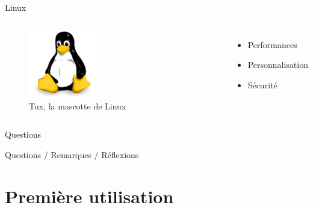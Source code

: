 \documentclass[aspectratio=169,xcolor=dvipsnames]{beamer}
\begin{document}
\begin{frame}{Linux}
    \begin{columns}[c] %

        \begin{figure}
            \includegraphics[width=0.4\textwidth]{images/tux.png}
            \captionsetup{labelformat=empty}
            \caption{Tux, la mascotte de Linux}
        \end{figure}

        \begin{itemize}
            \item Performances
            \item Personnalisation
            \item Sécurité
        \end{itemize}

    \end{columns}
\end{frame}


\begin{frame}{Questions}
    \begin{center}
        Questions / Remarques / Réflexions
    \end{center}
\end{frame}

\section{Première utilisation}
\end{document}

